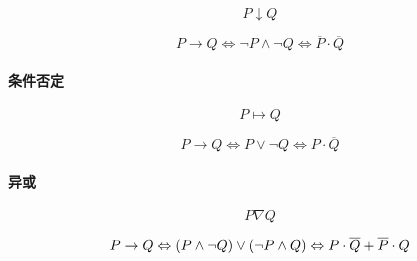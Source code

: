 \documentclass{article}
\begin{document}
\[P\downarrow Q\]

\begin{definition}
    \[P\rightarrow Q
        \Leftrightarrow\neg P \wedge\neg Q
        \Leftrightarrow\overline P\cdot\overline Q\]
\end{definition}

\paragraph{条件否定}

\[P\mapsto Q\]

\begin{definition}
    \[P\rightarrow Q
        \Leftrightarrow P \vee\neg Q
        \Leftrightarrow P\cdot\overline Q\]
\end{definition}

\paragraph{异或}

\[P\nabla Q\]

\begin{definition}
    \[P\rightarrow Q
        \Leftrightarrow\left(P\wedge\neg Q\right)\vee\left(\neg P\wedge Q\right)
        \Leftrightarrow P\cdot\overline Q+\overline P\cdot Q\]
\end{definition}
\end{document}
